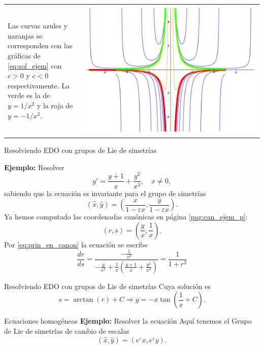 \documentclass{article}
\renewcommand{\epsilon}{\varepsilon}
\begin{document}
\begin{tabular}{m{0.3\linewidth} >{\centering\arraybackslash}m{0.7\linewidth} }
Las curvas azules y naranjas se corresponden con las gráficas de \eqref{eq:sol_ejem} con $c>0$ y $c<0$ respectivamente. La verde es la de $y=1/x^2$ y la roja de $y=-1/x^2$.
&
\includegraphics[scale=.4]{imagenes/SolGrup.png}
\end{tabular}




{Resolviendo EDO con grupos de Lie de simetrías}



\textbf{Ejemplo:} Resolver
\[y'=\frac{y+1}{x}+\frac{y^2}{x^3},\quad x\neq 0,\]
sabiendo que la ecuación es invariante para el grupo de simetrías
\[(\hat{x},\hat{y})=(\frac{x}{1-\epsilon x},\frac{y}{1-\epsilon x}   ).\]
Ya hemos computado las coordenadas canónicas en página \ref{pag:can_ejem_p}:
\[(r,s)=\left(\frac{y}{x},\frac{1}{x}\right).\]
Por \eqref{eq:prin_en_canon} la ecuación se escribe
\[\frac{dr}{ds}=\frac{-\frac{1}{x^2} }{-\frac{y}{x^2}+\frac{1}{x}\left(
\frac{y+1}{x}+\frac{y^2}{x^3}\right)}=\frac{1}{1+r^2}\]





{Resolviendo EDO con grupos de Lie de simetrías}
Cuya solución es 
\[s=\arctan(r)+C\Rightarrow y=-x\tan\left(\frac{1}{x}+C\right).\]



{Ecuaciones homogéneas}
\textbf{Ejemplo:} Resolver la ecuación 
Aquí tenemos el Grupo de Lie de simetrías de cambio de escalas
\[(\hat{x},\hat{y})=(e^{\epsilon}x,e^{\epsilon}y).\] 
\end{document}
